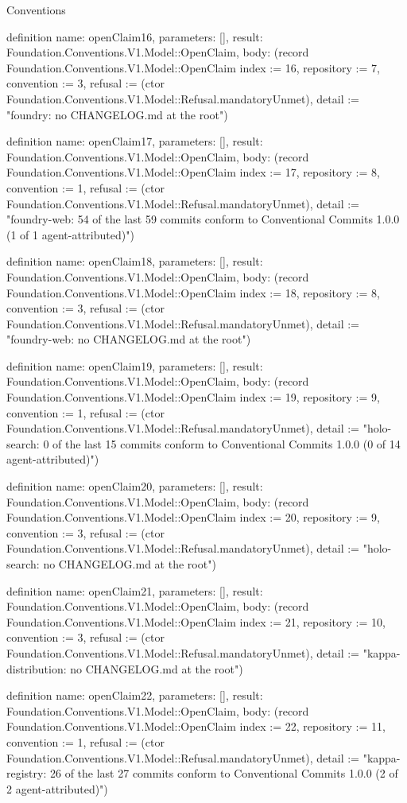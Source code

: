 \begin{lexlean}{Conventions}
\begin{semanticmodule}
definition{
  name: openClaim16,
  parameters: [],
  result: Foundation.Conventions.V1.Model::OpenClaim,
  body: (record Foundation.Conventions.V1.Model::OpenClaim {index := 16, repository := 7, convention := 3, refusal := (ctor Foundation.Conventions.V1.Model::Refusal.mandatoryUnmet), detail := "foundry: no CHANGELOG.md at the root"})
}

definition{
  name: openClaim17,
  parameters: [],
  result: Foundation.Conventions.V1.Model::OpenClaim,
  body: (record Foundation.Conventions.V1.Model::OpenClaim {index := 17, repository := 8, convention := 1, refusal := (ctor Foundation.Conventions.V1.Model::Refusal.mandatoryUnmet), detail := "foundry-web: 54 of the last 59 commits conform to Conventional Commits 1.0.0 (1 of 1 agent-attributed)"})
}

definition{
  name: openClaim18,
  parameters: [],
  result: Foundation.Conventions.V1.Model::OpenClaim,
  body: (record Foundation.Conventions.V1.Model::OpenClaim {index := 18, repository := 8, convention := 3, refusal := (ctor Foundation.Conventions.V1.Model::Refusal.mandatoryUnmet), detail := "foundry-web: no CHANGELOG.md at the root"})
}

definition{
  name: openClaim19,
  parameters: [],
  result: Foundation.Conventions.V1.Model::OpenClaim,
  body: (record Foundation.Conventions.V1.Model::OpenClaim {index := 19, repository := 9, convention := 1, refusal := (ctor Foundation.Conventions.V1.Model::Refusal.mandatoryUnmet), detail := "holo-search: 0 of the last 15 commits conform to Conventional Commits 1.0.0 (0 of 14 agent-attributed)"})
}

definition{
  name: openClaim20,
  parameters: [],
  result: Foundation.Conventions.V1.Model::OpenClaim,
  body: (record Foundation.Conventions.V1.Model::OpenClaim {index := 20, repository := 9, convention := 3, refusal := (ctor Foundation.Conventions.V1.Model::Refusal.mandatoryUnmet), detail := "holo-search: no CHANGELOG.md at the root"})
}

definition{
  name: openClaim21,
  parameters: [],
  result: Foundation.Conventions.V1.Model::OpenClaim,
  body: (record Foundation.Conventions.V1.Model::OpenClaim {index := 21, repository := 10, convention := 3, refusal := (ctor Foundation.Conventions.V1.Model::Refusal.mandatoryUnmet), detail := "kappa-distribution: no CHANGELOG.md at the root"})
}

definition{
  name: openClaim22,
  parameters: [],
  result: Foundation.Conventions.V1.Model::OpenClaim,
  body: (record Foundation.Conventions.V1.Model::OpenClaim {index := 22, repository := 11, convention := 1, refusal := (ctor Foundation.Conventions.V1.Model::Refusal.mandatoryUnmet), detail := "kappa-registry: 26 of the last 27 commits conform to Conventional Commits 1.0.0 (2 of 2 agent-attributed)"})
}


\end{semanticmodule}
\end{lexlean}
